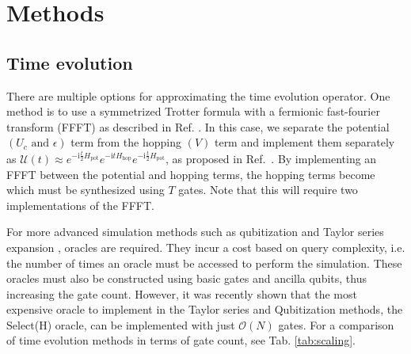 \documentclass[aip,reprint,table,xcdraw,usenames,dvipsnames]{revtex4-1}
\begin{document}
\section{Methods} \label{sec:methods}
\subsection*{Time evolution}
There are multiple options for approximating the time evolution operator. One  
method is to use a symmetrized Trotter formula with a fermionic fast-fourier transform (FFFT) as described in Ref. . In this case, we separate the 
potential $(U_c \text{ and } \epsilon)$ term from the hopping $(V)$ term and implement them separately as $\mathcal{U}(t)\approx e^{-\text{i} \frac{t}{2} H_{\text{pot}}} e^{-\text{i} t H_{\text{hop}}} e^{-\text{i} \frac{t}{2} H_{\text{pot}}}$, as proposed in Ref.~. By implementing an FFFT between the potential and hopping terms, the hopping terms become which must be synthesized using $T$ gates.
Note that this will require two implementations of the FFFT.

For more advanced simulation methods 
such as qubitization\cite{Low2019} and 
Taylor series expansion 
\cite{BerryTaylor2015}, oracles are 
required. They incur a cost 
based on query complexity, i.e. the 
number of times an oracle must be 
accessed to perform the simulation. 
These oracles must also be constructed using
basic gates and ancilla qubits, thus 
increasing the gate count. However, it was recently shown
that the most expensive oracle to implement in 
the Taylor series and Qubitization methods, the Select(H) oracle, can be implemented with just $\mathcal{O}(N)$ 
gates\cite{Wan2021}. For a comparison of time evolution methods
in terms of gate count, see Tab. \ref{tab:scaling}.
\end{document}
